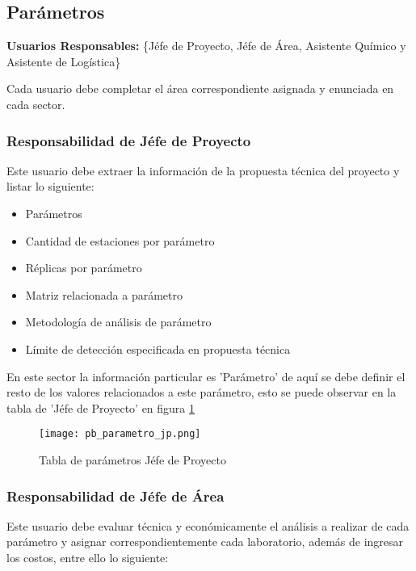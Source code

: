 \subsection{Parámetros} 

\textbf{Usuarios Responsables:} \{Jéfe de Proyecto, Jéfe de Área, Asistente Químico y Asistente de Logística\}

Cada usuario debe completar el área correspondiente asignada y enunciada en cada sector.

\subsubsection{Responsabilidad de Jéfe de Proyecto}

Este usuario debe extraer la información de la propuesta técnica del proyecto y listar lo
siguiente:

\begin{itemize}
 \item Parámetros
 \item Cantidad de estaciones por parámetro
 \item Réplicas por parámetro
 \item Matriz relacionada a parámetro
 \item Metodología de análisis de parámetro 
 \item Límite de detección especificada en propuesta técnica
\end{itemize}

En este sector la información particular es 'Parámetro' de aquí se debe definir el resto de los valores relacionados a este parámetro, esto se puede observar en la tabla de 'Jéfe de Proyecto' en figura \ref{pb_parametro_jp}

\begin{landscape}	 
\begin{figure}
	\centering
	\texttt{[image: pb\_parametro\_jp.png]}
	\caption{Tabla de parámetros Jéfe de Proyecto}
	\label{pb_parametro_jp}
\end{figure}
\end{landscape}

\subsubsection{Responsabilidad de Jéfe de Área}

Este usuario debe evaluar técnica y económicamente el análisis a realizar de cada parámetro y asignar correspondientemente cada laboratorio, además de ingresar los costos, entre ello lo siguiente:

